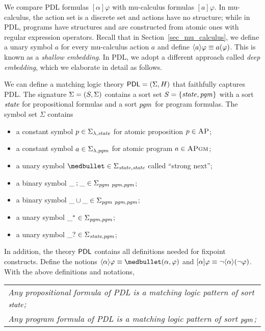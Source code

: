\documentclass{amsart}
\begin{document}
We compare PDL formulas $[\alpha] \varphi$
with mu-calculus formulas $[a]\varphi$.
In mu-calculus, the action set is a discrete set and actions have no structure;
while in PDL, programs have structures and are constructed from atomic ones with
regular expression operators.
Recall that in Section~\ref{sec_mu_calculus},
we define a unary symbol $a$ for every mu-calculus action $a$ and
define $\langle a\rangle \varphi \equiv a(\varphi)$.
This is known as a \emph{shallow embedding}.
In PDL, we adopt a different approach called \emph{deep embedding},
which we elaborate in detail as follows.

We can define a matching logic theory $\mathsf{PDL} = ({\Sigma}, H)$ that
faithfully captures PDL.
The signature ${\Sigma} = (S,\Sigma)$ contains
a sort set $S = \{ \mathit{state} , \mathit{pgm} \}$ with
a sort $\mathit{state}$ for propositional formulas and
a sort $\mathit{pgm}$ for program formulas.
The symbol set $\Sigma$ contains
\begin{itemize}
\item a constant symbol $p \in \Sigma_{\lambda,\mathit{state}}$
      for atomic proposition $p \in \textsc{AP}$;
\item a constant symbol $a \in \Sigma_{\lambda,\mathit{pgm}}$
      for atomic program $a \in \textsc{APgm}$;
\item a unary symbol $\snext \in \Sigma_{\statesort,\statesort}$ called ``strong next'';
\item a binary symbol $\_\mathbin{;}\_ \in \Sigma_{\mathit{pgm} \ \mathit{pgm} , \mathit{pgm}}$;
\item a binary symbol $\_ \mathbin{\cup} \_ \in \Sigma_{\mathit{pgm} \ \mathit{pgm} , \mathit{pgm}}$;
\item a unary symbol $\_ ^* \in \Sigma_{\mathit{pgm} , \mathit{pgm}}$;
\item a unary symbol $\_ {?} \in \Sigma_{\mathit{state}, \mathit{pgm}}$;
\end{itemize}
In addition, the theory $\mathsf{PDL}$ contains all definitions needed for fixpoint constructs.
Define the notions
$\angleBraces{\alpha} \varphi \equiv \snext(\alpha,\varphi)$
and $[\alpha] \varphi \equiv \neg \langle\alpha\rangle (\neg \varphi)$.
With the above definitions and notations,
\begin{center}
\begin{tabular}{l}
\em
Any propositional formula of PDL is a matching logic pattern of sort $\mathit{state}$;
\\
\em
Any program formula of PDL is a matching logic pattern of sort $\mathit{pgm}$;
\end{tabular}
\end{center}
\end{document}
